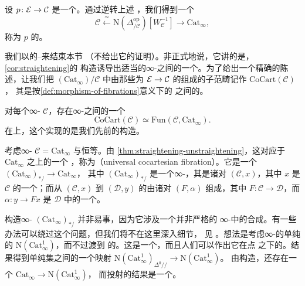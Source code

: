 \begin{corollary}\label{cor:straightening}
设 $p\colon \mathcal{E} \to \mathcal{C}$ 是一个\trCocartesianFibration{}。通过逆转上述%
\trEquivalence{}，我们得到一个\trFunctor{}%
\[
\mathcal{C}
\xleftarrow{\ \simeq\ }
\mathrm{N}(\Delta^{\mathrm{op}}_{/\mathcal{C}})[W_\mathcal{C}^{-1}]
\longrightarrow
\mathrm{Cat}_\infty,
\]
称为\trCocartesianFibration{} $p$ 的\trStraightening{}。
\end{corollary}

我们以\trLurie{}的\trStraightening{}--\trUnstraightening{}\trEquivalence{}来结束本节
（不给出它的证明）。非正式地说，它讲的是，\cref{cor:straightening}的\trStraightening{}%
构造诱导出适当的∞-\trCategories{}之间的一个\trEquivalence{}。为了给出一个精确的陈
述，让我们把\trSlice{} $(\mathrm{Cat}_\infty)/\mathcal{C}$ 中由那些为\trCocartesianFibration{}%
$\mathcal{E} \to \mathcal{C}$ 的\trObject{}组成的子范畴记作 $\mathrm{CoCart}(\mathcal{C})$，
其\trMorphism{}是按\cref{def:morphism-of-fibrations}意义下的\trCocartesianFibration{}%
之间的\trMorphism{}。

\begin{theorem}\label{thm:straightening-unstraightening}
对每个∞-\trCategory{} $\mathcal{C}$，存在∞-\trCategories{}之间的一个\trEquivalence{}%
\[
\mathrm{CoCart}(\mathcal{C}) \simeq \mathrm{Fun}(\mathcal{C}, \mathrm{Cat}_\infty).
\]
在\trObject{}上，这个\trEquivalence{}实现的是我们先前的构造。
\end{theorem}

\begin{definition}\label{def:universal-cocartesian-fibration}
考虑∞-\trCategory{} $\mathcal{C} = \mathrm{Cat}_\infty$ 与恒等\trFunctor{}。由%
\cref{thm:straightening-unstraightening}，这对应于 $\mathrm{Cat}_\infty$ 之上的一个%
\trCocartesianFibration{}，称为\emph{\trUniversalCocartesianFibration{}}（universal cocartesian
fibration）。它是一个\trFunctor{} $(\mathrm{Cat}_\infty)_{*\!/} \to \mathrm{Cat}_\infty$，
其中 $(\mathrm{Cat}_\infty)_{*\!/}$ 是一个∞-\trCategory{}，其\trObject{}是诸对
$(\mathcal{C}, x)$，其中 $x$ 是 $\mathcal{C}$ 的一个\trObject{}；而从 $(\mathcal{C}, x)$
到 $(\mathcal{D}, y)$ 的\trMorphism{}由诸对 $(F, \alpha)$ 组成，其中
$F\colon \mathcal{C} \to \mathcal{D}$，而 $\alpha\colon y \to Fx$ 是 $\mathcal{D}$
中的一个\trMorphism{}。
\end{definition}

\begin{remark}\label{rem:under-slice-construction}
构造∞-\trCategory{} $(\mathrm{Cat}_\infty)_{*\!/}$ 并非易事，因为它涉及一个并非严格的
∞-\trCategory{}中的合成。有一些办法可以绕过这个问题，但我们将不在这里深入细节，
见 \cite[Remark 6.1.19]{RV18}。想法是考虑∞-\trCategories{}的单纯\trCategory{}的%
\trCoherentNerve{} $\mathrm{N}(\mathrm{Cat}^1_\infty)$，而不过渡到\trFunctor{}%
\trCategories{}的\trGroupoid{}。这是一个\trSimplicialSet{}，而且人们可以作出它在点
之下的\trSlice{}。结果得到单纯集之间的一个映射
$\mathrm{N}(\mathrm{Cat}^1_\infty)_{\Delta^0/\!/} \to \mathrm{N}(\mathrm{Cat}^1_\infty)$。
由构造，还存在一个\trFunctor{} $\mathrm{Cat}_\infty \to \mathrm{N}(\mathrm{Cat}^1_\infty)$，
而\trSlice{}投射的\trPullback{}结果是一个\trCocartesianFibration{}。
\end{remark}

